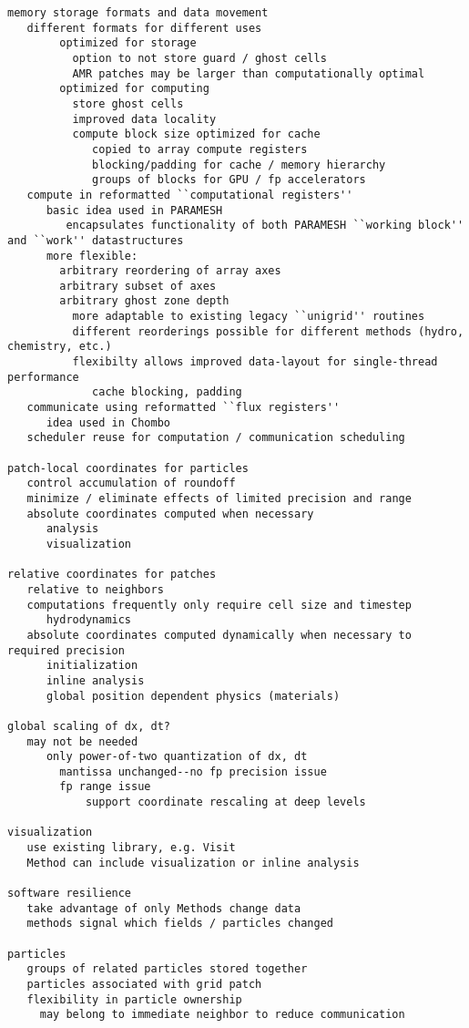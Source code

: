 \documentclass[14pt,letter]{article}
\begin{document}
\begin{verbatim}
memory storage formats and data movement
   different formats for different uses
        optimized for storage
          option to not store guard / ghost cells
          AMR patches may be larger than computationally optimal
        optimized for computing
          store ghost cells
          improved data locality
          compute block size optimized for cache
             copied to array compute registers
             blocking/padding for cache / memory hierarchy
             groups of blocks for GPU / fp accelerators
   compute in reformatted ``computational registers''
      basic idea used in PARAMESH
         encapsulates functionality of both PARAMESH ``working block'' and ``work'' datastructures
      more flexible:
        arbitrary reordering of array axes
        arbitrary subset of axes
        arbitrary ghost zone depth
          more adaptable to existing legacy ``unigrid'' routines
          different reorderings possible for different methods (hydro, chemistry, etc.)
          flexibilty allows improved data-layout for single-thread performance
             cache blocking, padding
   communicate using reformatted ``flux registers''
      idea used in Chombo
   scheduler reuse for computation / communication scheduling

patch-local coordinates for particles
   control accumulation of roundoff
   minimize / eliminate effects of limited precision and range
   absolute coordinates computed when necessary
      analysis
      visualization

relative coordinates for patches   
   relative to neighbors
   computations frequently only require cell size and timestep
      hydrodynamics
   absolute coordinates computed dynamically when necessary to required precision
      initialization
      inline analysis
      global position dependent physics (materials)

global scaling of dx, dt?
   may not be needed
      only power-of-two quantization of dx, dt
        mantissa unchanged--no fp precision issue
        fp range issue
            support coordinate rescaling at deep levels
        
visualization
   use existing library, e.g. Visit
   Method can include visualization or inline analysis

software resilience
   take advantage of only Methods change data
   methods signal which fields / particles changed

particles
   groups of related particles stored together
   particles associated with grid patch
   flexibility in particle ownership
     may belong to immediate neighbor to reduce communication



\end{verbatim}
\end{document}
